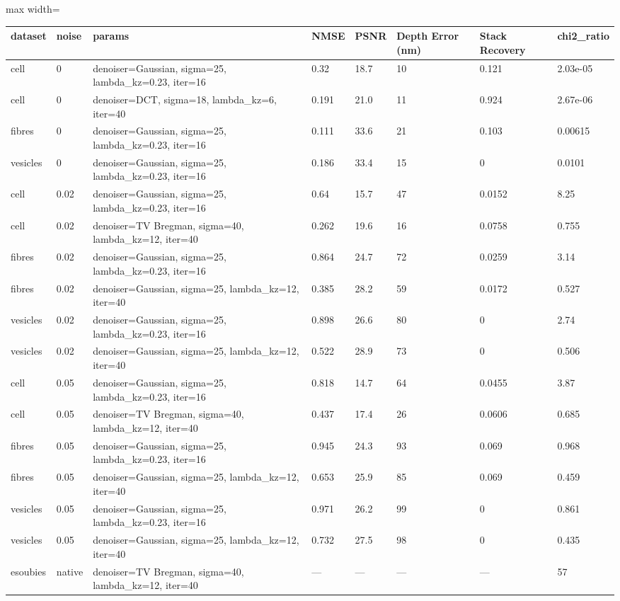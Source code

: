 \begin{center}\begin{minipage}{\linewidth}\centering
{}
\begin{adjustbox}{max width=\linewidth}
\begin{tabular}{llllllll}
\toprule
dataset & noise & params & NMSE & PSNR & Depth Error (nm) & Stack Recovery & chi2\_ratio \\
\midrule
cell & 0 & denoiser=Gaussian, sigma=25, lambda\_kz=0.23, iter=16 & 0.32 & 18.7 & 10 & 0.121 & 2.03e-05 \\
cell & 0 & denoiser=DCT, sigma=18, lambda\_kz=6, iter=40 & 0.191 & 21.0 & 11 & 0.924 & 2.67e-06 \\
fibres & 0 & denoiser=Gaussian, sigma=25, lambda\_kz=0.23, iter=16 & 0.111 & 33.6 & 21 & 0.103 & 0.00615 \\
vesicles & 0 & denoiser=Gaussian, sigma=25, lambda\_kz=0.23, iter=16 & 0.186 & 33.4 & 15 & 0 & 0.0101 \\
cell & 0.02 & denoiser=Gaussian, sigma=25, lambda\_kz=0.23, iter=16 & 0.64 & 15.7 & 47 & 0.0152 & 8.25 \\
cell & 0.02 & denoiser=TV Bregman, sigma=40, lambda\_kz=12, iter=40 & 0.262 & 19.6 & 16 & 0.0758 & 0.755 \\
fibres & 0.02 & denoiser=Gaussian, sigma=25, lambda\_kz=0.23, iter=16 & 0.864 & 24.7 & 72 & 0.0259 & 3.14 \\
fibres & 0.02 & denoiser=Gaussian, sigma=25, lambda\_kz=12, iter=40 & 0.385 & 28.2 & 59 & 0.0172 & 0.527 \\
vesicles & 0.02 & denoiser=Gaussian, sigma=25, lambda\_kz=0.23, iter=16 & 0.898 & 26.6 & 80 & 0 & 2.74 \\
vesicles & 0.02 & denoiser=Gaussian, sigma=25, lambda\_kz=12, iter=40 & 0.522 & 28.9 & 73 & 0 & 0.506 \\
cell & 0.05 & denoiser=Gaussian, sigma=25, lambda\_kz=0.23, iter=16 & 0.818 & 14.7 & 64 & 0.0455 & 3.87 \\
cell & 0.05 & denoiser=TV Bregman, sigma=40, lambda\_kz=12, iter=40 & 0.437 & 17.4 & 26 & 0.0606 & 0.685 \\
fibres & 0.05 & denoiser=Gaussian, sigma=25, lambda\_kz=0.23, iter=16 & 0.945 & 24.3 & 93 & 0.069 & 0.968 \\
fibres & 0.05 & denoiser=Gaussian, sigma=25, lambda\_kz=12, iter=40 & 0.653 & 25.9 & 85 & 0.069 & 0.459 \\
vesicles & 0.05 & denoiser=Gaussian, sigma=25, lambda\_kz=0.23, iter=16 & 0.971 & 26.2 & 99 & 0 & 0.861 \\
vesicles & 0.05 & denoiser=Gaussian, sigma=25, lambda\_kz=12, iter=40 & 0.732 & 27.5 & 98 & 0 & 0.435 \\
esoubies & native & denoiser=TV Bregman, sigma=40, lambda\_kz=12, iter=40 & — & — & — & — & 57 \\
\bottomrule
\end{tabular}\end{adjustbox}\end{minipage}\end{center}
